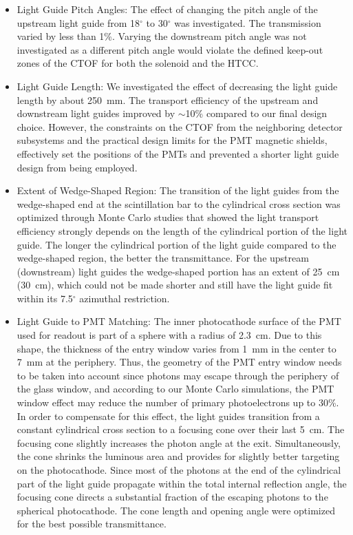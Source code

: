 \documentclass[3p,times,twocolumn]{elsarticle}
\begin{document}
\begin{itemize}

\item Light Guide Pitch Angles: The effect of changing the pitch angle of the upstream light guide from
18$^\circ$ to 30$^\circ$ was investigated. The transmission varied by less than 1\%. Varying the
downstream pitch angle was not investigated as a different pitch angle would violate the defined keep-out
zones of the CTOF for both the solenoid and the HTCC.

\vskip 0.5cm

\item Light Guide Length: We investigated the effect of decreasing the light guide length by about 250~mm.
The transport efficiency of the upstream and downstream light guides improved by $\sim$10\% compared
to our final design choice. However, the constraints on the CTOF from the neighboring detector subsystems
and the practical design limits for the PMT magnetic shields, effectively set the positions of the PMTs and
prevented a shorter light guide design from being employed.

\vskip 0.5cm

\item Extent of Wedge-Shaped Region: The transition of the light guides from the wedge-shaped end at
the scintillation bar to the cylindrical cross section was optimized through Monte Carlo studies that showed
the light transport efficiency strongly depends on the length of the cylindrical portion of the light guide. The
longer the cylindrical portion of the light guide compared to the wedge-shaped region, the better the
transmittance. For the upstream (downstream) light guides the wedge-shaped portion has an extent of 25~cm
(30~cm), which could not be made shorter and still have the light guide fit within its 7.5$^\circ$ azimuthal
restriction.

\vskip 0.5cm

\item Light Guide to PMT Matching: The inner photocathode surface of the PMT used for readout is part of
a sphere with a radius of 2.3~cm. Due to this shape, the thickness of the entry window varies from 1~mm in
the center to 7~mm at the periphery. Thus, the geometry of the PMT entry window needs to be taken into
account since photons may escape through the periphery of the glass window, and according to our Monte
Carlo simulations, the PMT window effect may reduce the number of primary photoelectrons up to 30\%. In
order to compensate for this effect, the light guides transition from a constant cylindrical cross section to a
focusing cone over their last 5~cm. The focusing cone slightly increases the photon angle at the exit.
Simultaneously, the cone shrinks the luminous area and provides for slightly better targeting on the
photocathode. Since most of the photons at the end of the cylindrical part of the light guide propagate within
the total internal reflection angle, the focusing cone directs a substantial fraction of the escaping photons to
the spherical photocathode. The cone length and opening angle were optimized for the best possible
transmittance. 

\end{itemize}
\end{document}

